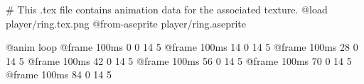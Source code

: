 # This .tex file contains animation data for the associated texture.
@load player/ring.tex.png
@from-aseprite player/ring.aseprite

@anim loop
	@frame 100ms 0 0 14 5
	@frame 100ms 14 0 14 5
	@frame 100ms 28 0 14 5
	@frame 100ms 42 0 14 5
	@frame 100ms 56 0 14 5
	@frame 100ms 70 0 14 5
	@frame 100ms 84 0 14 5
